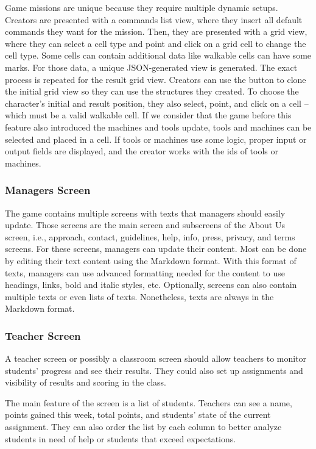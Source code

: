 Game missions are unique because they require multiple dynamic setups.
Creators are presented with a commands list view, where they insert all default commands they want for the mission.
Then, they are presented with a grid view, where they can select a cell type and point and click on a grid cell to change the cell type.
Some cells can contain additional data like walkable cells can have some marks.
For those data, a unique JSON-generated view is generated.
The exact process is repeated for the result grid view.
Creators can use the button to clone the initial grid view so they can use the structures they created.
To choose the character's initial and result position, they also select, point, and click on a cell -- which must be a valid walkable cell.
If we consider that the game before this feature also introduced the machines and tools update, tools and machines can be selected and placed in a cell.
If tools or machines use some logic, proper input or output fields are displayed, and the creator works with the ids of tools or machines.

\subsubsection{Managers Screen}

The game contains multiple screens with texts that managers should easily update.
Those screens are the main screen and subscreens of the About Us screen, i.e., approach, contact, guidelines, help, info, press, privacy, and terms screens.
For these screens, managers can update their content.
Most can be done by editing their text content using the Markdown format.
With this format of texts, managers can use advanced formatting needed for the content to use headings, links, bold and italic styles, etc.
Optionally, screens can also contain multiple texts or even lists of texts.
Nonetheless, texts are always in the Markdown format.

\subsubsection{Teacher Screen}

A teacher screen or possibly a classroom screen should allow teachers to monitor students' progress and see their results.
They could also set up assignments and visibility of results and scoring in the class.

The main feature of the screen is a list of students.
Teachers can see a name, points gained this week, total points, and students' state of the current assignment.
They can also order the list by each column to better analyze students in need of help or students that exceed expectations.

